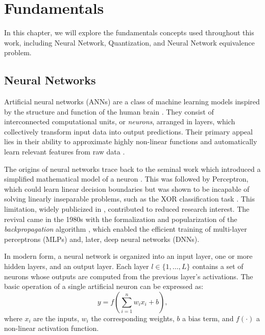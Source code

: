 \chapter{Fundamentals} \label{chap:fundamentos}


In this chapter, we will explore the fundamentals concepts used throughout this work, including Neural Network, Quantization, and Neural Network equivalence problem.


\section{Neural Networks}
\label{sec:nn}

Artificial neural networks (ANNs) are a class of machine learning models inspired by the structure and function of the human brain \cite{mcculloch1943logical}. They consist of interconnected computational units, or \textit{neurons}, arranged in layers, which collectively transform input data into output predictions. Their primary appeal lies in their ability to approximate highly non-linear functions and automatically learn relevant features from raw data \cite{goodfellow2016deep}.

The origins of neural networks trace back to the seminal work which introduced a simplified mathematical model of a neuron \cite{mcculloch1943logical}. This was followed by \cite{Rosenblatt1958} Perceptron, which could learn linear decision boundaries but was shown to be incapable of solving linearly inseparable problems, such as the XOR classification task \cite{minsky1969perceptrons}. This limitation, widely publicized in \cite{minsky1969perceptrons}, contributed to reduced research interest. The revival came in the 1980s with the formalization and popularization of the \textit{backpropagation} algorithm \cite{werbos1974beyond,rumelhart1986learning}, which enabled the efficient training of multi-layer perceptrons (MLPs) and, later, deep neural networks (DNNs).

In modern form, a neural network is organized into an input layer, one or more hidden layers, and an output layer. Each layer $l \in \{1, \dots, L\}$ contains a set of neurons whose outputs are computed from the previous layer's activations. The basic operation of a single artificial neuron can be expressed as:
\begin{equation}
    y = f\left( \sum_{i=1}^{n} w_i x_i + b \right),
    \end{equation}
where $x_i$ are the inputs, $w_i$ the corresponding weights, $b$ a bias term, and $f(\cdot)$ a non-linear activation function. 



